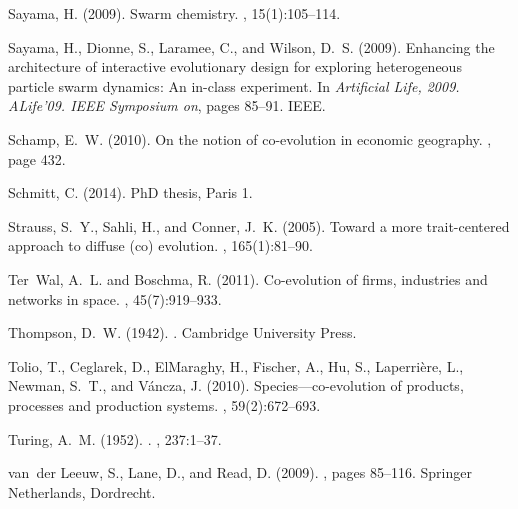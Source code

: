 \documentclass[letterpaper]{article}
\begin{document}
\begin{thebibliography}{}
Sayama, H. (2009).
\newblock Swarm chemistry.
, 15(1):105--114.

Sayama, H., Dionne, S., Laramee, C., and Wilson, D.~S. (2009).
\newblock Enhancing the architecture of interactive evolutionary design for
  exploring heterogeneous particle swarm dynamics: An in-class experiment.
\newblock In {\em Artificial Life, 2009. ALife'09. IEEE Symposium on}, pages
  85--91. IEEE.

Schamp, E.~W. (2010).
\newblock On the notion of co-evolution in economic geography.
, page 432.

Schmitt, C. (2014).
\newblock PhD thesis, Paris 1.

Strauss, S.~Y., Sahli, H., and Conner, J.~K. (2005).
\newblock Toward a more trait-centered approach to diffuse (co) evolution.
, 165(1):81--90.

Ter~Wal, A.~L. and Boschma, R. (2011).
\newblock Co-evolution of firms, industries and networks in space.
, 45(7):919--933.

Thompson, D.~W. (1942).
.
\newblock Cambridge University Press.

Tolio, T., Ceglarek, D., ElMaraghy, H., Fischer, A., Hu, S., Laperri{\`e}re,
  L., Newman, S.~T., and V{\'a}ncza, J. (2010).
\newblock Species---co-evolution of products, processes and production systems.
, 59(2):672--693.

Turing, A.~M. (1952).
.
,
  237:1--37.

van~der Leeuw, S., Lane, D., and Read, D. (2009).
, pages 85--116.
\newblock Springer Netherlands, Dordrecht.


\end{thebibliography}
\end{document}
